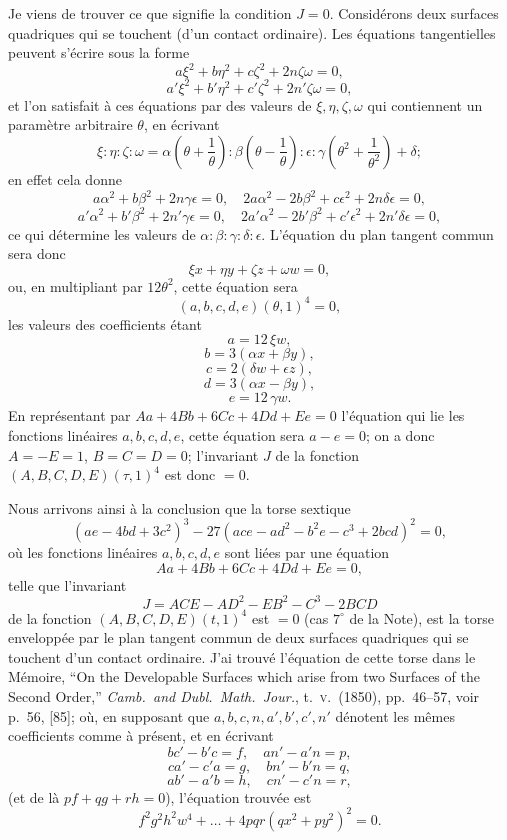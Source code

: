 \documentclass[11pt,a4paper]{article}
\begin{document}
Je viens de trouver ce que signifie la condition $J = 0$. Consid\'erons deux surfaces
quadriques qui se touchent (d'un contact ordinaire). Les \'equations tangentielles peuvent
s'\'ecrire sous la forme
\[
a \xi^2 + b \eta^2 + c \zeta^2 + 2n \zeta \omega = 0,
\]
\[
a' \xi^2 + b' \eta^2 + c' \zeta^2 + 2n' \zeta \omega = 0,
\]
et l'on satisfait \`a ces \'equations par des valeurs de $\xi, \eta, \zeta, \omega$ qui
contiennent un param\`etre arbitraire $\theta$, en \'ecrivant
\[
\xi : \eta : \zeta : \omega = \alpha \left(\theta + \frac{1}{\theta}\right)
 : \beta \left(\theta - \frac{1}{\theta}\right) : \epsilon : \gamma \left(\theta^2 + \frac{1}{\theta^2}\right) + \delta;
\]
en effet cela donne
\[
a \alpha^2 + b \beta^2 + 2n \gamma \epsilon = 0,\quad
2 a \alpha^2 - 2 b \beta^2 + c \epsilon^2 + 2 n \delta \epsilon = 0,
\]
\[
a' \alpha^2 + b' \beta^2 + 2 n' \gamma \epsilon = 0,\quad
2 a' \alpha^2 - 2 b' \beta^2 + c' \epsilon^2 + 2 n' \delta \epsilon = 0,
\]
ce qui d\'etermine les valeurs de $\alpha : \beta : \gamma : \delta : \epsilon$.
L'\'equation du plan tangent commun sera donc
\[
\xi x + \eta y + \zeta z + \omega w = 0,
\]
ou, en multipliant par $12 \theta^2$, cette \'equation sera
\[
(a, b, c, d, e)(\theta, 1)^4 = 0,
\]
les valeurs des coefficients \'etant
\[
a = 12 \, \xi w,
\]
\[
b = 3 (\alpha x + \beta y),
\]
\[
c = 2 (\delta w + \epsilon z),
\]
\[
d = 3 (\alpha x - \beta y),
\]
\[
e = 12 \, \gamma w.
\]
En repr\'esentant par $Aa + 4Bb + 6Cc + 4Dd + Ee = 0$ l'\'equation qui lie les fonctions
lin\'eaires $a, b, c, d, e$, cette \'equation sera $a - e = 0$; on a donc
$A = -E = 1$, $B = C = D = 0$; l'invariant $J$ de la fonction $(A, B, C, D, E)(\tau, 1)^4$
est donc $= 0$.

Nous arrivons ainsi \`a la conclusion que la torse sextique
\[
(ae - 4bd + 3c^2)^3 - 27 (ace - ad^2 - b^2 e - c^3 + 2bcd)^2 = 0,
\]
o\`u les fonctions lin\'eaires $a, b, c, d, e$ sont li\'ees par une \'equation
\[
Aa + 4Bb + 6Cc + 4Dd + Ee = 0,
\]
telle que l'invariant
\[
J = ACE - AD^2 - EB^2 - C^3 - 2BCD
\]
de la fonction $(A, B, C, D, E)(t, 1)^4$ est $= 0$ (cas $7^\circ$ de la Note), est la
torse envelopp\'ee par le plan tangent commun de deux surfaces quadriques qui se touchent
d'un contact ordinaire. J'ai trouv\'e l'\'equation de cette torse dans le M\'emoire,
``On the Developable Surfaces which arise from two Surfaces of the Second Order,''
\textit{Camb.\ and Dubl.\ Math.\ Jour.}, t.\ \textsc{v}.\ (1850), pp.\ 46--57, voir p.\ 56,
[85]; o\`u, en supposant que $a, b, c, n, a', b', c', n'$ d\'enotent les m\^emes
coefficients comme \`a pr\'esent, et en \'ecrivant
\[
bc' - b'c = f,\quad an' - a'n = p,
\]
\[
ca' - c'a = g,\quad bn' - b'n = q,
\]
\[
ab' - a'b = h,\quad cn' - c'n = r,
\]
(et de l\`a $pf + qg + rh = 0$), l'\'equation trouv\'ee est
\[
f^2 g^2 h^2 w^4 + \ldots + 4 pqr (qx^2 + py^2)^2 = 0.
\]
\end{document}
